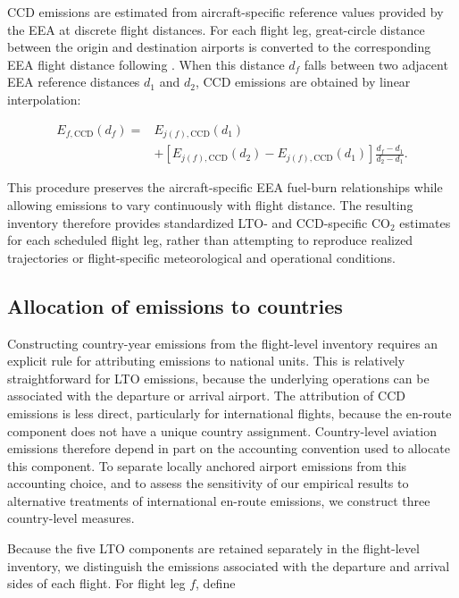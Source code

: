 \documentclass[12pt]{extarticle}
\begin{document}
CCD emissions are estimated from aircraft-specific reference values provided by the EEA at discrete flight distances. For each flight leg, great-circle distance between the origin and destination airports is converted to the corresponding EEA flight distance following \citet{avogadro2024}. When this distance $d_f$ falls between two adjacent EEA reference distances $d_1$ and $d_2$, CCD emissions are obtained by linear interpolation:

\begin{equation}
\begin{split}
E_{f,\mathrm{CCD}}(d_f)
={}&
E_{j(f),\mathrm{CCD}}(d_1)\\
&+
\left[
E_{j(f),\mathrm{CCD}}(d_2)
-
E_{j(f),\mathrm{CCD}}(d_1)
\right]
\frac{d_f-d_1}{d_2-d_1}.
\end{split}
\label{eq:nature_3}
\end{equation}

This procedure preserves the aircraft-specific EEA fuel-burn relationships while allowing emissions to vary continuously with flight distance. The resulting inventory therefore provides standardized LTO- and CCD-specific CO$_2$ estimates for each scheduled flight leg, rather than attempting to reproduce realized trajectories or flight-specific meteorological and operational conditions.

\subsection*{Allocation of emissions to countries}

Constructing country-year emissions from the flight-level inventory requires an explicit rule for attributing emissions to national units. This is relatively straightforward for LTO emissions, because the underlying operations can be associated with the departure or arrival airport. The attribution of CCD emissions is less direct, particularly for international flights, because the en-route component does not have a unique country assignment. Country-level aviation emissions therefore depend in part on the accounting convention used to allocate this component. To separate locally anchored airport emissions from this accounting choice, and to assess the sensitivity of our empirical results to alternative treatments of international en-route emissions, we construct three country-level measures.

Because the five LTO components are retained separately in the flight-level inventory, we distinguish the emissions associated with the departure and arrival sides of each flight. For flight leg $f$, define
\end{document}
